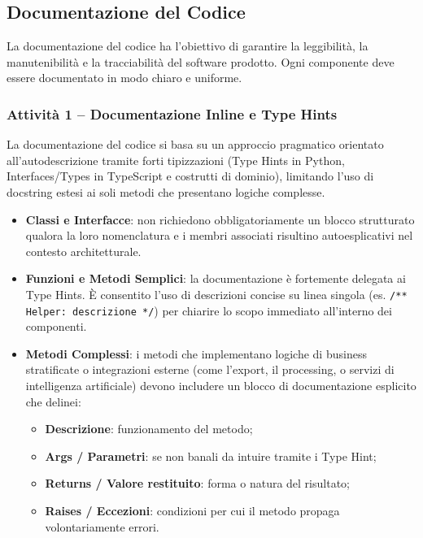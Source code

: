\documentclass[a4paper, 11pt, oneside]{scrartcl}
\begin{document}
\subsection{Documentazione del Codice}
\label{sec:documentazione_codice}

La documentazione del codice ha l'obiettivo di garantire la leggibilità, la manutenibilità e la tracciabilità del software{\scriptsize{}} prodotto. Ogni componente deve essere documentato in modo chiaro e uniforme.

\subsubsection{Attività 1 -- Documentazione Inline e Type Hints}

La documentazione del codice si basa su un approccio pragmatico orientato all'autodescrizione tramite forti tipizzazioni (Type Hints in Python, Interfaces/Types in TypeScript e costrutti di dominio), limitando l'uso di docstring estesi ai soli metodi che presentano logiche complesse.

\begin{itemize}
    \item \textbf{Classi e Interfacce}: non richiedono obbligatoriamente un blocco strutturato qualora la loro nomenclatura e i membri associati risultino autoesplicativi nel contesto architetturale.
    \item \textbf{Funzioni e Metodi Semplici}: la documentazione è fortemente delegata ai Type Hints. È consentito l'uso di descrizioni concise su linea singola (es. \texttt{/** Helper: descrizione */}) per chiarire lo scopo immediato all'interno dei componenti.
    \item \textbf{Metodi Complessi}: i metodi che implementano logiche di business stratificate o integrazioni esterne (come l'export, il processing, o servizi di intelligenza artificiale) devono includere un blocco di documentazione esplicito che delinei:
    \begin{itemize}
        \item \textbf{Descrizione}: funzionamento del metodo;
        \item \textbf{Args / Parametri}: se non banali da intuire tramite i Type Hint;
        \item \textbf{Returns / Valore restituito}: forma o natura del risultato;
        \item \textbf{Raises / Eccezioni}: condizioni per cui il metodo propaga volontariamente errori.
    \end{itemize}
\end{itemize}
\end{document}
